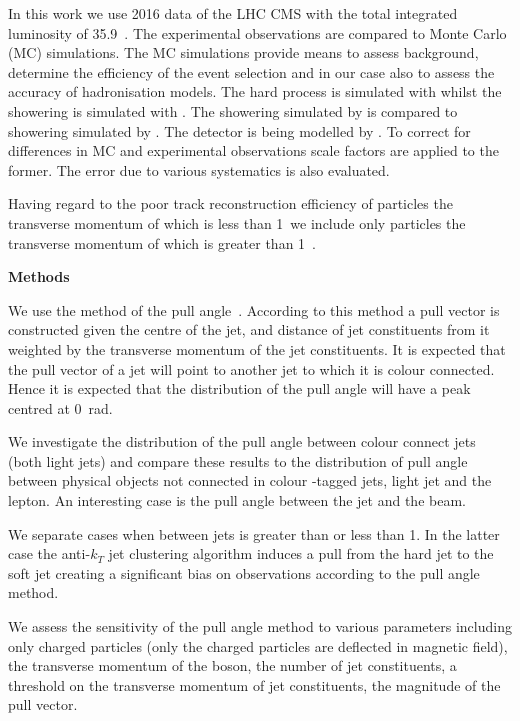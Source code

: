 In this work we use 2016 data of the LHC CMS with the total integrated luminosity of 35.9~\fbinv. The experimental observations are compared to Monte Carlo (MC) simulations. The MC simulations provide means to assess background, determine the efficiency of the event selection and in our case also to assess the accuracy of hadronisation models. The hard process is simulated with \POWHEG whilst the showering is simulated with \PYTHIA. The showering simulated by \PYTHIA is compared to showering simulated by \HERWIGpp. The detector is being modelled by \GEANTfour. To correct for differences in MC and experimental observations scale factors are applied to the former. The error due to various systematics is also evaluated. 

Having regard to the poor track reconstruction efficiency of particles the transverse momentum of which is less than 1~\GeV we include only particles the transverse momentum of which is greater than 1~\GeV.
 
\medskip
\textbf{Methods}
\nopagebreak\medskip

We use the method of the pull angle~\cite{Gallicchio:2010sw}. According to this method a pull vector is constructed given the centre of the jet, and distance of jet constituents from it weighted by the transverse momentum \pt of the jet constituents. It is expected that the pull vector of a jet will point to another jet to which it is colour connected. Hence it is expected that the distribution of the pull angle will have a peak centred at 0~rad.

We investigate the distribution of the pull angle between colour connect jets (both light jets) and compare these results to the distribution of pull angle between physical objects not connected in colour \textendash \cPqb-tagged jets, light jet and the lepton. An interesting case is the pull angle between the jet and the beam.

We separate cases when \DeltaR between jets is greater than or less than 1. In the latter case the anti-$k_{T}$ jet clustering algorithm induces a pull from the hard jet to the soft jet creating a significant bias on observations according to the pull angle method.

We assess the sensitivity of the pull angle method to various parameters \textendash including only charged particles (only the charged particles are deflected in magnetic field), the transverse momentum of the \PW boson, the number of jet constituents, a threshold on the transverse momentum of jet constituents, the magnitude of the pull vector.

